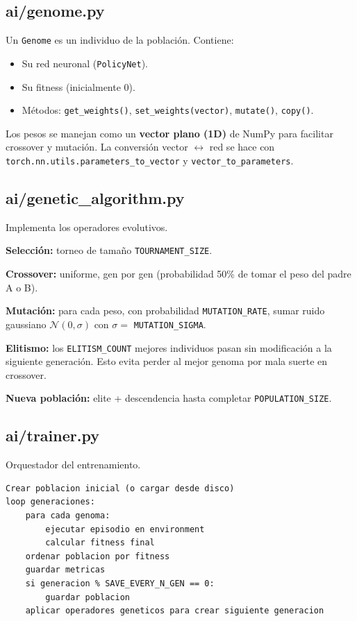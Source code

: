\documentclass[11pt,a4paper]{article}
\begin{document}
\subsection{ai/genome.py}

Un \texttt{Genome} es un individuo de la población. Contiene:
\begin{itemize}
    \item Su red neuronal (\texttt{PolicyNet}).
    \item Su fitness (inicialmente 0).
    \item Métodos: \texttt{get\_weights()}, \texttt{set\_weights(vector)}, \texttt{mutate()}, \texttt{copy()}.
\end{itemize}

Los pesos se manejan como un \textbf{vector plano (1D)} de NumPy para facilitar crossover y mutación. La conversión vector $\leftrightarrow$ red se hace con \texttt{torch.nn.utils.parameters\_to\_vector} y \texttt{vector\_to\_parameters}.

\subsection{ai/genetic\_algorithm.py}

Implementa los operadores evolutivos.

\textbf{Selección:} torneo de tamaño \texttt{TOURNAMENT\_SIZE}.

\textbf{Crossover:} uniforme, gen por gen (probabilidad 50\% de tomar el peso del padre A o B).

\textbf{Mutación:} para cada peso, con probabilidad \texttt{MUTATION\_RATE}, sumar ruido gaussiano $\mathcal{N}(0, \sigma)$ con $\sigma = $ \texttt{MUTATION\_SIGMA}.

\textbf{Elitismo:} los \texttt{ELITISM\_COUNT} mejores individuos pasan sin modificación a la siguiente generación. Esto evita perder al mejor genoma por mala suerte en crossover.

\textbf{Nueva población:} elite + descendencia hasta completar \texttt{POPULATION\_SIZE}.

\subsection{ai/trainer.py}

Orquestador del entrenamiento.

\begin{lstlisting}
Crear poblacion inicial (o cargar desde disco)
loop generaciones:
    para cada genoma:
        ejecutar episodio en environment
        calcular fitness final
    ordenar poblacion por fitness
    guardar metricas
    si generacion % SAVE_EVERY_N_GEN == 0:
        guardar poblacion
    aplicar operadores geneticos para crear siguiente generacion
\end{lstlisting}
\end{document}
